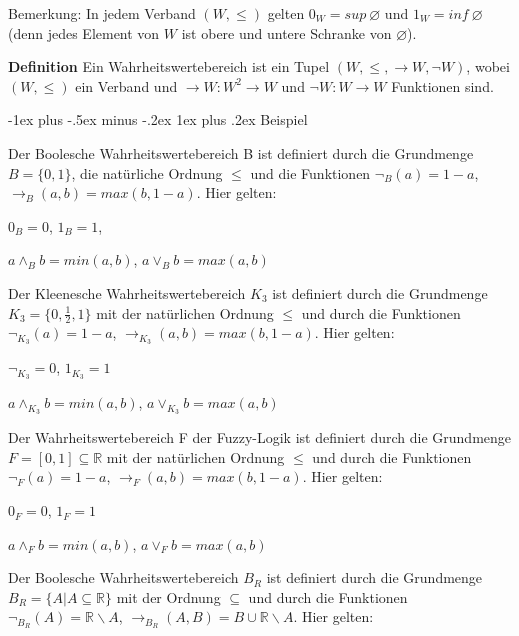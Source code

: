 \documentclass[a4paper]{article}
\makeatletter
\renewcommand{\note}[2]{\begin{noteBox} \textbf{#1} #2 \end{noteBox}}
\renewcommand{\subsubsection}{\@startsection{subsubsection}{3}{0mm}%
                {-1ex plus -.5ex minus -.2ex}%
                {1ex plus .2ex}%
                {\normalfont\small\bfseries}}
\makeatother
\begin{document}
\begin{multicols}{3}
  Bemerkung: In jedem Verband $(W,\leq)$ gelten $0_W= sup\ \varnothing$ und $1_W= inf\ \varnothing$ (denn jedes Element von $W$ ist obere und untere Schranke von $\varnothing$).

  \note{Definition}{Ein Wahrheitswertebereich ist ein Tupel $(W,\leq,\rightarrow W,\lnot W)$, wobei $(W,\leq)$ ein Verband und $\rightarrow W:W^2 \rightarrow W$ und $\lnot W:W\rightarrow W$  Funktionen sind.}

  \subsubsection{Beispiel}
  \begin{itemize*}
    \item Der Boolesche Wahrheitswertebereich B ist definiert durch die Grundmenge $B=\{0,1\}$, die natürliche Ordnung $\leq$ und die Funktionen $\lnot_B (a) = 1-a$, $\rightarrow_B(a,b) = max(b, 1 -a)$. Hier gelten:
    \begin{itemize*}
      \item $0_B=0$, $1_B= 1$,
      \item $a\wedge_B b= min(a,b)$, $a\vee_B b= max(a,b)$
    \end{itemize*}
    \item Der Kleenesche Wahrheitswertebereich $K_3$ ist definiert durch die Grundmenge $K_3=\{0,\frac{1}{2},1\}$ mit der natürlichen Ordnung $\leq$ und durch die Funktionen $\lnot_{K_3} (a) = 1 -a $, $\rightarrow_{K_3} (a,b) = max(b, 1-a)$. Hier gelten:
    \begin{itemize*}
      \item $\lnot_{K_3} = 0$, $1_{K_3} = 1$
      \item $a\wedge_{K_3} b= min(a,b)$, $a\vee_{K_3} b= max(a,b)$
    \end{itemize*}
    \item Der Wahrheitswertebereich F der Fuzzy-Logik ist definiert durch die Grundmenge $F=[0,1]\subseteq\mathbb{R}$ mit der natürlichen Ordnung $\leq$ und durch die Funktionen $\lnot_F (a) = 1-a$, $\rightarrow_F (a,b) = max(b, 1-a)$. Hier gelten:
    \begin{itemize*}
      \item $0_F= 0$, $1_F= 1$
      \item $a\wedge_F b= min(a,b)$, $a\vee_F b= max(a,b)$
    \end{itemize*}
    \item Der Boolesche Wahrheitswertebereich $B_R$ ist definiert durch die Grundmenge $B_R=\{A|A\subseteq \mathbb{R}\}$ mit der Ordnung $\subseteq$ und durch die Funktionen $\lnot_{B_R} (A) =\mathbb{R}\backslash A$, $\rightarrow_{B_R} (A,B) = B\cup\mathbb{R}\backslash A$. Hier gelten:

\end{itemize*}
\end{multicols}
\end{document}
